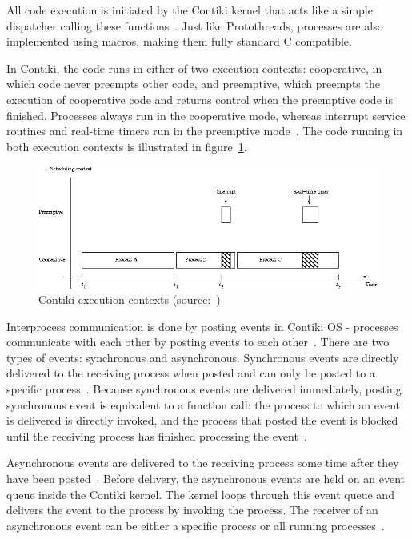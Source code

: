 All code execution is initiated by the Contiki kernel
that acts like a simple dispatcher calling these functions~\cite{contiki-docs}.
Just like Protothreads, processes are also implemented using macros,
making them fully standard C compatible.

In Contiki, the code runs in either of two execution contexts:
cooperative, in which code never preempts other code, and preemptive,
which preempts the execution of cooperative code and returns control
when the preemptive code is finished.
Processes always run in the cooperative mode,
whereas interrupt service routines and real-time timers run in the preemptive mode~\cite{contiki-wiki-processes}.
The code running in both execution contexts is illustrated in figure~\ref{fig:contiki-execution-context}.

\begin{figure}
  \centering
  \includegraphics[width=13cm,keepaspectratio]{fig/Execution-contexts.png}
  \caption{Contiki execution contexts (source:~\cite{contiki-wiki-processes})}
  \label{fig:contiki-execution-context}
\end{figure}

Interprocess communication is done by posting events in Contiki OS -
processes communicate with each other by posting events to each other~\cite{paper-contiki}.
There are two types of events: synchronous and asynchronous.
Synchronous events are directly delivered to the receiving process when posted and
can only be posted to a specific process~\cite{contiki-wiki-processes}.
Because synchronous events are delivered immediately,
posting synchronous event is equivalent to a function call:
the process to which an event is delivered is directly invoked,
and the process that posted the event is blocked
until the receiving process has finished processing the event~\cite{contiki-wiki-processes}.

Asynchronous events are delivered to the receiving process
some time after they have been posted~\cite{contiki-wiki-processes}.
Before delivery, the asynchronous events are held on an event queue inside the Contiki kernel.
The kernel loops through this event queue and delivers
the event to the process by invoking the process.
The receiver of an asynchronous event can be either a specific process
or all running processes~\cite{contiki-wiki-processes}.

